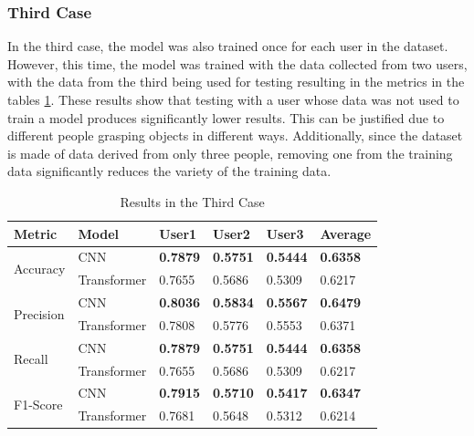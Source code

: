 \subsubsection{Third Case}

In the third case, the model was also trained once for each user in the dataset. However, this time, the model was trained with the data collected from two users, with the data from the third being used for testing resulting in the metrics in the tables \ref{table:results_third_case}. These results show that testing with a user whose data was not used to train a model produces significantly lower results. This can be justified due to different people grasping objects in different ways. Additionally, since the dataset is made of data derived from only three people, removing one from the training data significantly reduces the variety of the training data.

\begin{table}[H]
    \centering
    \caption{Results in the Third Case}
    \label{table:results_third_case}
    \begin{tabular}{|l|l|l|l|l|l|}
        \hline
        Metric & Model & User1 & User2 & User3 & Average \\
        \hline \hline
        \multirow{2}{*}{Accuracy} & CNN & \textbf{0.7879} & \textbf{0.5751} & \textbf{0.5444} & \textbf{0.6358} \\
        \cline{2-6}
        & Transformer & 0.7655 & 0.5686 & 0.5309 & 0.6217 \\
        \hline \hline
        \multirow{2}{*}{Precision} & CNN & \textbf{0.8036} & \textbf{0.5834} & \textbf{0.5567} & \textbf{0.6479} \\
        \cline{2-6}
        & Transformer & 0.7808 & 0.5776 & 0.5553 & 0.6371 \\
        \hline \hline
        \multirow{2}{*}{Recall} & CNN & \textbf{0.7879} & \textbf{0.5751} & \textbf{0.5444} & \textbf{0.6358} \\
        \cline{2-6}
        & Transformer & 0.7655 & 0.5686 & 0.5309 & 0.6217 \\
        \hline \hline
        \multirow{2}{*}{F1-Score} & CNN & \textbf{0.7915} & \textbf{0.5710} & \textbf{0.5417} & \textbf{0.6347} \\
        \cline{2-6}
        & Transformer & 0.7681 & 0.5648 & 0.5312 & 0.6214 \\
        \hline
    \end{tabular}
\end{table}

